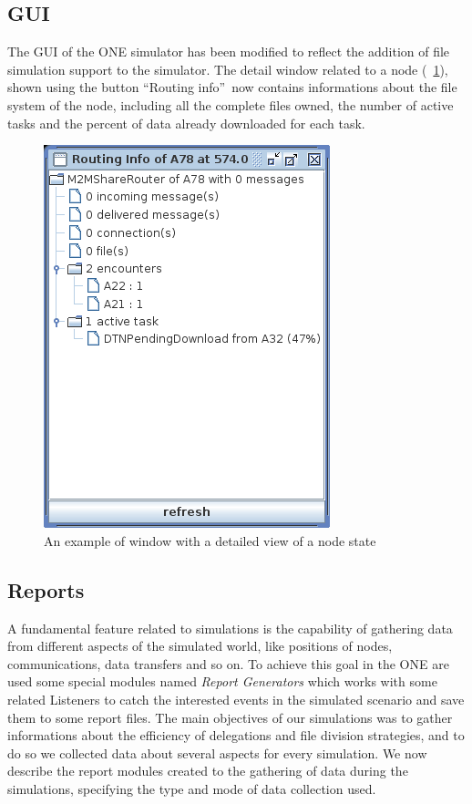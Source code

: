 \subsection{GUI}
The GUI of the ONE simulator has been modified to reflect the addition of file simulation support to the simulator. The detail window related to a node (\figurename~\ref{implRouting-Info}), shown using the button \textquotedblleft Routing info\textquotedblright \ now contains informations about the file system of the node, including all the complete files owned, the number of active tasks and the percent of data already downloaded for each task. 
\begin{figure}[htpb]
  \begin{center}
    \includegraphics[scale=0.6]{6-implementazione/img/Routing-Info.png}
    \caption{An example of window with a detailed view of a node state}    
    \label{implRouting-Info}
  \end{center}
\end{figure}

\subsection{Reports}
\label{descrReports}
A fundamental feature related to simulations is the capability of gathering data from different aspects of the simulated world, like positions of nodes, communications, data transfers and so on. To achieve this goal in the ONE are used some special modules named \textit{Report Generators} which works with some related Listeners to catch the interested events in the simulated scenario and save them to some report files.
The main objectives of our simulations was to gather informations about the efficiency of delegations and file division strategies, and to do so we collected data about several aspects for every simulation. We now describe the report modules created to the gathering of data during the simulations, specifying the type and mode of data collection used.

